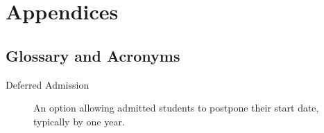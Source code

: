\documentclass[oneside,11pt]{book}
\newcommand{\myepigraphsimpsons}[1]{
  \epigraph{\vspace{-0.2in} \emph{#1}}{\textsc{The Simpsons}}
}
\begin{document}

\part{Appendices}\label{part:appendices}
\appendix
\chapter{Glossary and Acronyms}\label{chap:glossary}

\printglossary

\printglossary[type=\acronymtype]

\glsaddallunused

\newpage
\begin{description}


  \item [Deferred Admission] An option allowing admitted students to postpone their start date, typically by one year.
  
\end{description}





\end{document}
